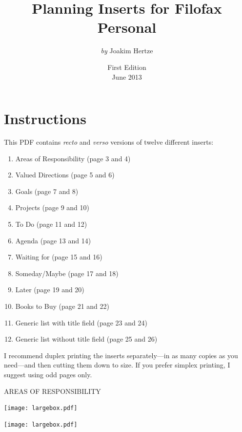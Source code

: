 \documentclass[11pt,titlepage]{article}
\begin{document}
	
\title{Planning Inserts for Filofax Personal}
\author{\emph{by} Joakim Hertze}
\date{First Edition \\ June 2013}

\maketitle

\pagebreak

\section{Instructions}
This PDF contains \emph{recto} and \emph{verso} versions of twelve different inserts:

\begin{enumerate}
	\item Areas of Responsibility (page 3 and 4)
	\item Valued Directions (page 5 and 6)
	\item Goals (page 7 and 8)
	\item Projects (page 9 and 10)
	\item To Do (page 11 and 12)
	\item Agenda (page 13 and 14)
	\item Waiting for (page 15 and 16)
	\item Someday/Maybe (page 17 and 18)
	\item Later (page 19 and 20)
	\item Books to Buy (page 21 and 22)
	\item Generic list with title field (page 23 and 24)
	\item Generic list without title field (page 25 and 26)
\end{enumerate}

I recommend duplex printing the inserts separately---in as many copies as you need---and then cutting them down to size. If you prefer simplex printing, I suggest using odd pages only.

\pagebreak

\small %
\hfill AREAS OF RESPONSIBILITY

\vspace{6mm}

\noindent
\texttt{[image: largebox.pdf]}

\vspace{7,5mm}

\noindent
\texttt{[image: largebox.pdf]}

\vspace{7,5mm}
\end{document}
